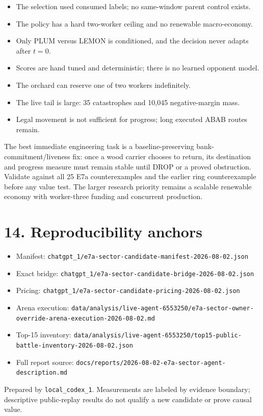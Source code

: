 \documentclass[10pt,a4paper]{article}
\begin{document}
\begin{itemize}
  \item The selection used consumed labels; no same-window parent control exists.
  \item The policy has a hard two-worker ceiling and no renewable macro-economy.
  \item Only PLUM versus LEMON is conditioned, and the decision never adapts after $t=0$.
  \item Scores are hand tuned and deterministic; there is no learned opponent model.
  \item The orchard can reserve one of two workers indefinitely.
  \item The live tail is large: 35 catastrophes and 10,045 negative-margin mass.
  \item Legal movement is not sufficient for progress; long executed ABAB routes remain.
\end{itemize}

The best immediate engineering task is a baseline-preserving bank-commitment/liveness fix:
once a wood carrier chooses to return, its destination and progress measure must remain
stable until DROP or a proved obstruction. Validate against all 25 E7a counterexamples and
the earlier ring counterexample before any value test. The larger research priority remains
a scalable renewable economy with worker-three funding and concurrent production.

\section*{14. Reproducibility anchors}

\small\sloppy
\begin{itemize}
  \item Manifest: \nolinkurl{chatgpt_1/e7a-sector-candidate-manifest-2026-08-02.json}
  \item Exact bridge: \nolinkurl{chatgpt_1/e7a-sector-candidate-bridge-2026-08-02.json}
  \item Pricing: \nolinkurl{chatgpt_1/e7a-sector-candidate-pricing-2026-08-02.json}
  \item Arena execution: \nolinkurl{data/analysis/live-agent-6553250/e7a-sector-owner-override-arena-execution-2026-08-02.md}
  \item Top-15 inventory: \nolinkurl{data/analysis/live-agent-6553250/top15-public-battle-inventory-2026-08-02.json}
  \item Full report source: \nolinkurl{docs/reports/2026-08-02-e7a-sector-agent-description.md}
\end{itemize}

\vfill
\footnotesize\color{muted}
Prepared by \texttt{local\_codex\_1}. Measurements are labeled by evidence boundary;
descriptive public-replay results do not qualify a new candidate or prove causal value.
\end{document}
